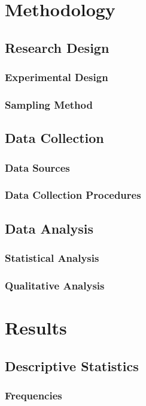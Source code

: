 \documentclass[writingLanguage=english, %
    addPageTitle=on,  %
    addDeclaration=on, %
    addMUSTlog=off, %
    addFigTOC=on, %
    addTabTOC=on, %
    refIndent=off, %
    printMod=off, %
]{must}
\begin{document}
\chapter{Methodology}
\section{Research Design}
\subsection{Experimental Design}
\subsection{Sampling Method}
\section{Data Collection}
\subsection{Data Sources}
\subsection{Data Collection Procedures}
\section{Data Analysis}
\subsection{Statistical Analysis}
\subsection{Qualitative Analysis}

\chapter{Results}
\section{Descriptive Statistics}
\subsection{Frequencies}
\end{document}
